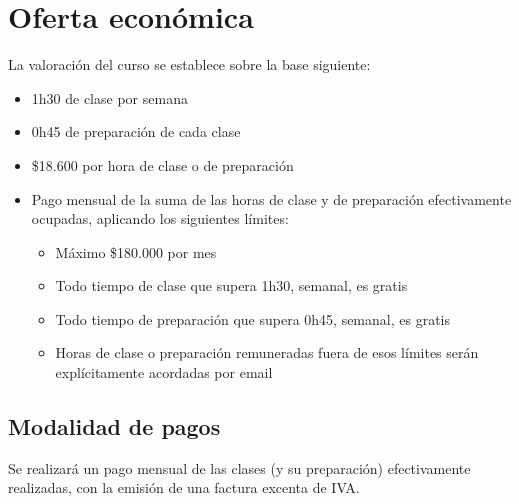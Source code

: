 \documentclass[11pt]{article}
\begin{document}
\section{Oferta econ\'omica}
La valoraci\'on del curso se establece sobre la base siguiente:
\begin{itemize}
  \item 1h30 de clase por semana
  \item 0h45 de preparaci\'on de cada clase
  \item \$18.600 por hora de clase o de preparaci\'on
  \item Pago mensual de la suma de las horas de clase y de preparaci\'on
      efectivamente ocupadas, aplicando los siguientes l\'imites:
      \begin{itemize}
        \item M\'aximo \$180.000 por mes
        \item Todo tiempo de clase que supera 1h30, semanal, es gratis
        \item Todo tiempo de preparaci\'on que supera 0h45, semanal, es gratis
        \item Horas de clase o preparaci\'on remuneradas fuera de esos l\'imites
            ser\'an expl\'icitamente acordadas por email
      \end{itemize}
\end{itemize}


\subsection{Modalidad de pagos}
Se realizar\'a un pago mensual de las clases (y su preparaci\'on) efectivamente
realizadas, con la emisi\'on de una factura excenta de IVA.






\end{document}
